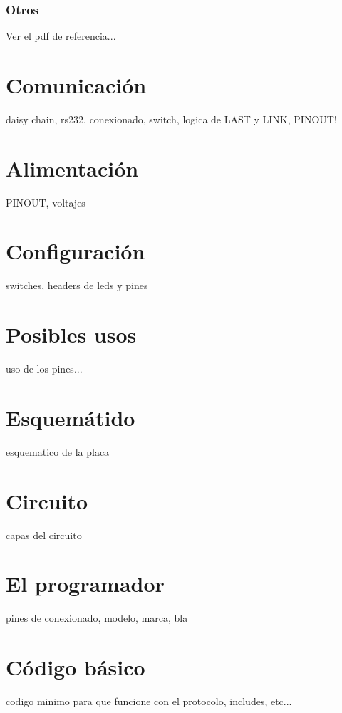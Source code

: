 \documentclass[a4paper,10pt]{article}
\begin{document}
\subsubsection{Otros}
\label{otros}

Ver el pdf de referencia...

\section{Comunicaci\'on}
\label{comunicacion}

daisy chain, rs232, conexionado, switch, logica de LAST y LINK, PINOUT!

\section{Alimentaci\'on}
\label{alimentacion}

PINOUT, voltajes

\section{Configuraci\'on}
\label{configuracion}

switches, headers de leds y pines

\section{Posibles usos}
\label{usos}

uso de los pines...

\section{Esquem\'atido}
\label{esquematico}

esquematico de la placa

\section{Circuito}
\label{circuito}

capas del circuito

\section{El programador}
\label{programador}

pines de conexionado, modelo, marca, bla

\section{C\'odigo b\'asico}
\label{codigo}

codigo minimo para que funcione con el protocolo, includes, etc...
\end{document}
